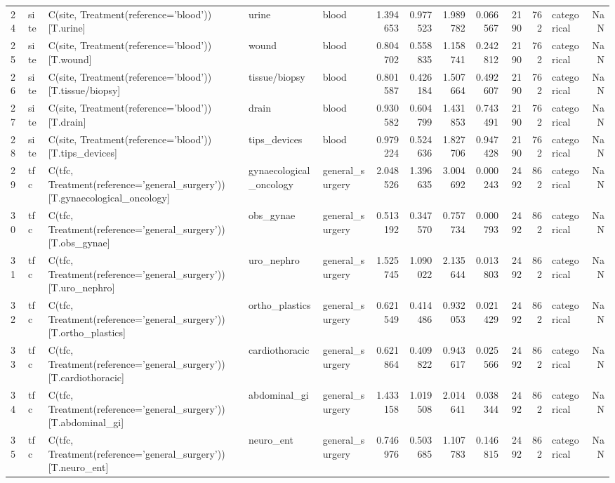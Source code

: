 \begin{tabular}{lllllrrrrrrlr}
24 & site & C(site, Treatment(reference='blood'))[T.urine] & urine & blood & 1.394653 & 0.977523 & 1.989782 & 0.066567 & 2190 & 762 & categorical & NaN \\
25 & site & C(site, Treatment(reference='blood'))[T.wound] & wound & blood & 0.804702 & 0.558835 & 1.158741 & 0.242812 & 2190 & 762 & categorical & NaN \\
26 & site & C(site, Treatment(reference='blood'))[T.tissue/biopsy] & tissue/biopsy & blood & 0.801587 & 0.426184 & 1.507664 & 0.492607 & 2190 & 762 & categorical & NaN \\
27 & site & C(site, Treatment(reference='blood'))[T.drain] & drain & blood & 0.930582 & 0.604799 & 1.431853 & 0.743491 & 2190 & 762 & categorical & NaN \\
28 & site & C(site, Treatment(reference='blood'))[T.tips_devices] & tips_devices & blood & 0.979224 & 0.524636 & 1.827706 & 0.947428 & 2190 & 762 & categorical & NaN \\
29 & tfc & C(tfc, Treatment(reference='general_surgery'))[T.gynaecological_oncology] & gynaecological_oncology & general_surgery & 2.048526 & 1.396635 & 3.004692 & 0.000243 & 2492 & 862 & categorical & NaN \\
30 & tfc & C(tfc, Treatment(reference='general_surgery'))[T.obs_gynae] & obs_gynae & general_surgery & 0.513192 & 0.347570 & 0.757734 & 0.000793 & 2492 & 862 & categorical & NaN \\
31 & tfc & C(tfc, Treatment(reference='general_surgery'))[T.uro_nephro] & uro_nephro & general_surgery & 1.525745 & 1.090022 & 2.135644 & 0.013803 & 2492 & 862 & categorical & NaN \\
32 & tfc & C(tfc, Treatment(reference='general_surgery'))[T.ortho_plastics] & ortho_plastics & general_surgery & 0.621549 & 0.414486 & 0.932053 & 0.021429 & 2492 & 862 & categorical & NaN \\
33 & tfc & C(tfc, Treatment(reference='general_surgery'))[T.cardiothoracic] & cardiothoracic & general_surgery & 0.621864 & 0.409822 & 0.943617 & 0.025566 & 2492 & 862 & categorical & NaN \\
34 & tfc & C(tfc, Treatment(reference='general_surgery'))[T.abdominal_gi] & abdominal_gi & general_surgery & 1.433158 & 1.019508 & 2.014641 & 0.038344 & 2492 & 862 & categorical & NaN \\
35 & tfc & C(tfc, Treatment(reference='general_surgery'))[T.neuro_ent] & neuro_ent & general_surgery & 0.746976 & 0.503685 & 1.107783 & 0.146815 & 2492 & 862 & categorical & NaN \\

\end{tabular}
